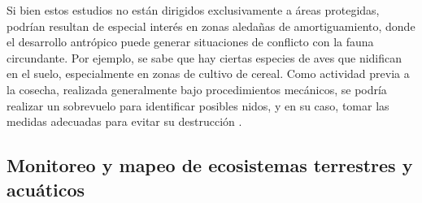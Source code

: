 \documentclass[onecolumn]{extarticle}
\begin{document}
Si bien estos estudios no están dirigidos exclusivamente a áreas
protegidas, podrían resultan de especial interés en zonas aledañas de
amortiguamiento, donde el desarrollo antrópico puede generar situaciones
de conflicto con la fauna circundante. Por ejemplo, se sabe que hay
ciertas especies de aves que nidifican en el suelo, especialmente en
zonas de cultivo de cereal. Como actividad previa a la cosecha,
realizada generalmente bajo procedimientos mecánicos, se podría realizar
un sobrevuelo para identificar posibles nidos, y en su caso, tomar las
medidas adecuadas para evitar su destrucción \citep{Mulero-Negro}.

\subsection{Monitoreo y mapeo de ecosistemas terrestres y
acuáticos}\label{monitoreo-y-mapeo-de-ecosistemas-terrestres-y-acuaticos}
\end{document}
